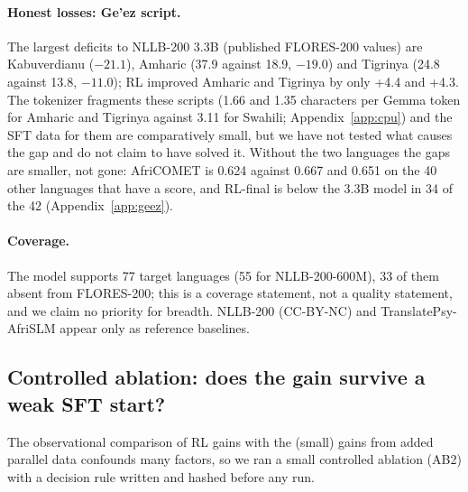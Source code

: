 \paragraph{Honest losses: Ge'ez script.} The largest deficits to NLLB-200 3.3B (published FLORES-200 values) are Kabuverdianu ($-21.1$), Amharic (37.9 against 18.9, $-19.0$) and Tigrinya (24.8 against 13.8, $-11.0$); RL improved Amharic and Tigrinya by only +4.4 and +4.3. The tokenizer fragments these scripts (1.66 and 1.35 characters per Gemma token for Amharic and Tigrinya against 3.11 for Swahili; Appendix~\ref{app:cpu}) and the SFT data for them are comparatively small, but we have not tested what causes the gap and do not claim to have solved it. Without the two languages the gaps are smaller, not gone: AfriCOMET is 0.624 against 0.667 and 0.651 on the 40 other languages that have a score, and RL-final is below the 3.3B model in 34 of the 42 (Appendix~\ref{app:geez}).

\paragraph{Coverage.} The model supports 77 target languages (55 for NLLB-200-600M), 33 of them absent from FLORES-200; this is a coverage statement, not a quality statement, and we claim no priority for breadth. NLLB-200 (CC-BY-NC) and TranslatePsy-AfriSLM appear only as reference baselines.

\subsection{Controlled ablation: does the gain survive a weak SFT start?}\label{sec:ab2}
The observational comparison of RL gains with the (small) gains from added parallel data confounds many factors, so we ran a small controlled ablation (AB2) with a decision rule written and hashed before any run.
